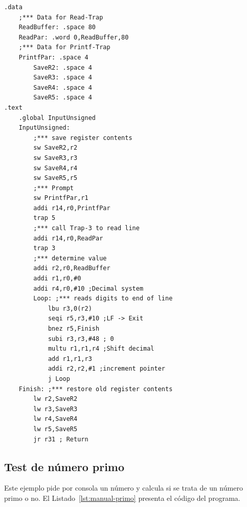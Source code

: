 \documentclass[../main.tex]{subfiles}
\begin{document}
\begin{lstlisting}[caption={Librería input.},label={lst:manual-factorial-2}]
.data
	;*** Data for Read-Trap
	ReadBuffer: .space 80
	ReadPar: .word 0,ReadBuffer,80
	;*** Data for Printf-Trap
	PrintfPar: .space 4
		SaveR2: .space 4
		SaveR3: .space 4
		SaveR4: .space 4
		SaveR5: .space 4
.text
	.global InputUnsigned
	InputUnsigned:
		;*** save register contents
		sw SaveR2,r2
		sw SaveR3,r3
		sw SaveR4,r4
		sw SaveR5,r5
		;*** Prompt
		sw PrintfPar,r1
		addi r14,r0,PrintfPar
		trap 5
		;*** call Trap-3 to read line
		addi r14,r0,ReadPar
		trap 3
		;*** determine value
		addi r2,r0,ReadBuffer
		addi r1,r0,#0
		addi r4,r0,#10 ;Decimal system
		Loop: ;*** reads digits to end of line
			lbu r3,0(r2)
			seqi r5,r3,#10 ;LF -> Exit
			bnez r5,Finish
			subi r3,r3,#48 ; 0
			multu r1,r1,r4 ;Shift decimal
			add r1,r1,r3
			addi r2,r2,#1 ;increment pointer
			j Loop
	Finish: ;*** restore old register contents
		lw r2,SaveR2
		lw r3,SaveR3
		lw r4,SaveR4
		lw r5,SaveR5
		jr r31 ; Return
\end{lstlisting}

\subsection{Test de número primo}

Este ejemplo pide por consola un número y calcula si se trata de un número primo o no. El Listado~\ref{lst:manual-primo} presenta el código del programa.
\end{document}

